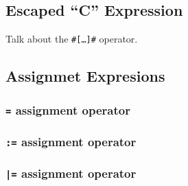 \subsection{Escaped ``C'' Expression}
\label{ssec:escapedC}
Talk about the \texttt{\#[\ldots]\#} operator.

\subsection{Assignmet Expresions}
\label{ssec:assignment}

\subsubsection{\texttt{=} assignment operator}

\subsubsection{\texttt{:=} assignment operator}

\subsubsection{\texttt{|=} assignment operator}

